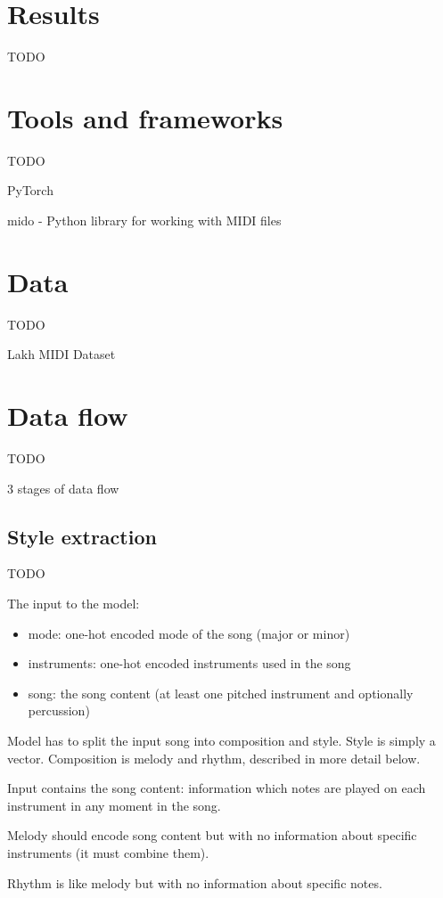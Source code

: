 \documentclass[en]{pracamgr}
\begin{document}
\chapter{Results}

TODO

\chapter{Tools and frameworks}

TODO

PyTorch

mido - Python library for working with MIDI files

\chapter{Data}

TODO

Lakh MIDI Dataset

\chapter{Data flow}

TODO

3 stages of data flow

\section{Style extraction}

TODO

The input to the model:
\begin{itemize}
\item mode: one-hot encoded mode of the song (major or minor)
\item instruments: one-hot encoded instruments used in the song
\item song: the song content (at least one pitched instrument and optionally percussion)
\end{itemize}
Model has to split the input song into composition and style. Style is simply a vector. Composition is melody and rhythm, described in more detail below.

Input contains the song content: information which notes are played on each instrument in any moment in the song.

Melody should encode song content but with no information about specific instruments (it must combine them).

Rhythm is like melody but with no information about specific notes.
\end{document}
